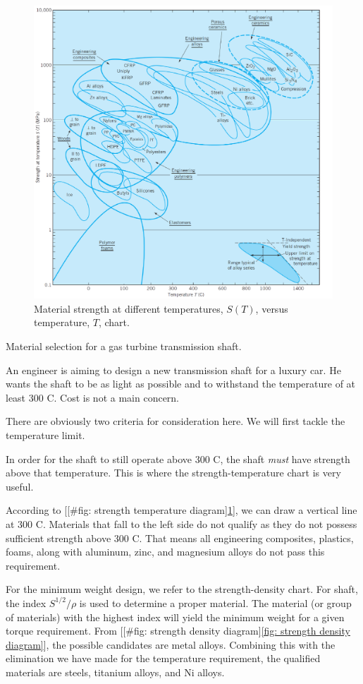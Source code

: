 \documentclass[a4paper,openany,12pt]{book}
\begin{document}
\begin{enumerate}
\begin{figure}[htbp]
\centering
\includegraphics[width=.9\linewidth]{pictures/Material-selection/strength-temperature-diagram.pdf}
\caption{\label{fig: strength temperature diagram}
Material strength at different temperatures, \(S(T)\), versus temperature, \(T\), chart. \cite{ashby2010materials}}
\end{figure}

Material selection for a gas turbine transmission shaft.

An engineer is aiming to design a new transmission shaft for a luxury
car. He wants the shaft to be as light as possible and to withstand the
temperature of at least 300 C. Cost is not a main concern.

There are obviously two criteria for consideration here. We will first
tackle the temperature limit.

In order for the shaft to still operate above 300 C, the shaft \emph{must}
have strength above that temperature. This is where the
strength-temperature chart is very useful.

According to
[[\#fig: strength temperature diagram]\ref{fig: strength temperature diagram}],
we can draw a vertical line at 300 C. Materials that fall to the left
side do not qualify as they do not possess sufficient strength above 300
C. That means all engineering composites, plastics, foams, along with
aluminum, zinc, and magnesium alloys do not pass this requirement.

For the minimum weight design, we refer to the strength-density chart.
For shaft, the index \(S^{1/2}/\rho\) is used to determine a proper
material. The material (or group of materials) with the highest index
will yield the minimum weight for a given torque requirement. From
[[\#fig: strength density diagram]\ref{fig: strength density diagram}], the
possible candidates are metal alloys. Combining this with the
elimination we have made for the temperature requirement, the qualified
materials are steels, titanium alloys, and Ni alloys.
\end{enumerate}
\end{document}
